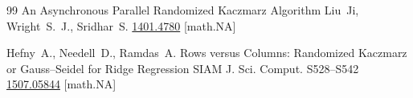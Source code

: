\begin{thebibliography}{99}
\eprint An Asynchronous Parallel Randomized Kaczmarz Algorithm
\by Liu~Ji,  Wright~S.~J., Sridhar~S.
\arxiv \href{https://arxiv.org/abs/1401.4780}{1401.4780} [math.NA]

\by Hefny~A., Needell~D., Ramdas~A.
\paper Rows versus Columns: Randomized Kaczmarz or Gauss--Seidel for Ridge Regression
\jour SIAM J. Sci. Comput.
\pages S528--S542
\arxiv \href{https://arxiv.org/abs/1507.05844}{1507.05844} [math.NA]

\end{thebibliography}

%
%
